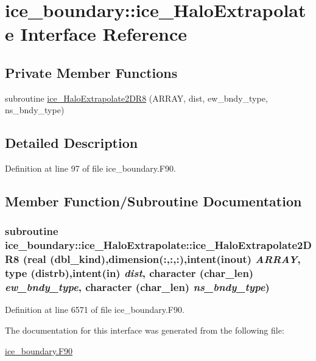\hypertarget{interfaceice__boundary_1_1ice__HaloExtrapolate}{
\section{ice\_\-boundary::ice\_\-HaloExtrapolate Interface Reference}
\label{interfaceice__boundary_1_1ice__HaloExtrapolate}
}
\subsection*{Private Member Functions}
\begin{DoxyCompactItemize}
\item 
subroutine \hyperlink{interfaceice__boundary_1_1ice__HaloExtrapolate_afff13f882a7d7efef0070e3834219de5}{ice\_\-HaloExtrapolate2DR8} (ARRAY, dist, ew\_\-bndy\_\-type, ns\_\-bndy\_\-type)
\end{DoxyCompactItemize}


\subsection{Detailed Description}


Definition at line 97 of file ice\_\-boundary.F90.

\subsection{Member Function/Subroutine Documentation}
\hypertarget{interfaceice__boundary_1_1ice__HaloExtrapolate_afff13f882a7d7efef0070e3834219de5}{
\subsubsection[{ice\_\-HaloExtrapolate2DR8}]{\setlength{\rightskip}{0pt plus 5cm}subroutine ice\_\-boundary::ice\_\-HaloExtrapolate::ice\_\-HaloExtrapolate2DR8 (real (dbl\_\-kind),dimension(:,:,:),intent(inout) {\em ARRAY}, \/  type ({\bf distrb}),intent(in) {\em dist}, \/  character (char\_\-len) {\em ew\_\-bndy\_\-type}, \/  character (char\_\-len) {\em ns\_\-bndy\_\-type})}}
\label{interfaceice__boundary_1_1ice__HaloExtrapolate_afff13f882a7d7efef0070e3834219de5}


Definition at line 6571 of file ice\_\-boundary.F90.

The documentation for this interface was generated from the following file:\begin{DoxyCompactItemize}
\item 
\hyperlink{ice__boundary_8F90}{ice\_\-boundary.F90}\end{DoxyCompactItemize}
